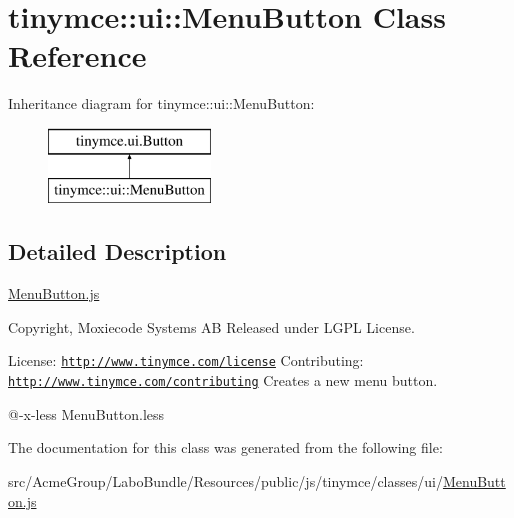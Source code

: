 \hypertarget{classtinymce_1_1ui_1_1_menu_button}{\section{tinymce\+:\+:ui\+:\+:Menu\+Button Class Reference}
\label{classtinymce_1_1ui_1_1_menu_button}
}
Inheritance diagram for tinymce\+:\+:ui\+:\+:Menu\+Button\+:\begin{figure}[H]
\begin{center}
\leavevmode
\includegraphics[height=2.000000cm]{classtinymce_1_1ui_1_1_menu_button}
\end{center}
\end{figure}


\subsection{Detailed Description}
\hyperlink{_menu_button_8js}{Menu\+Button.\+js}

Copyright, Moxiecode Systems A\+B Released under L\+G\+P\+L License.

License\+: \href{http://www.tinymce.com/license}{\tt http\+://www.\+tinymce.\+com/license} Contributing\+: \href{http://www.tinymce.com/contributing}{\tt http\+://www.\+tinymce.\+com/contributing} Creates a new menu button.

@-\/x-\/less Menu\+Button.\+less 

The documentation for this class was generated from the following file\+:\begin{DoxyCompactItemize}
\item 
src/\+Acme\+Group/\+Labo\+Bundle/\+Resources/public/js/tinymce/classes/ui/\hyperlink{_menu_button_8js}{Menu\+Button.\+js}\end{DoxyCompactItemize}
